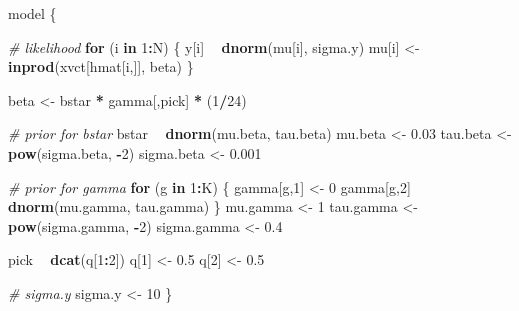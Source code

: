 \documentclass[]{article}
\newenvironment{Shaded}{\begin{snugshade}}{\end{snugshade}}
\newcommand{\KeywordTok}[1]{\textcolor[rgb]{0.13,0.29,0.53}{\textbf{#1}}}
\newcommand{\DecValTok}[1]{\textcolor[rgb]{0.00,0.00,0.81}{#1}}
\newcommand{\FloatTok}[1]{\textcolor[rgb]{0.00,0.00,0.81}{#1}}
\newcommand{\StringTok}[1]{\textcolor[rgb]{0.31,0.60,0.02}{#1}}
\newcommand{\CommentTok}[1]{\textcolor[rgb]{0.56,0.35,0.01}{\textit{#1}}}
\newcommand{\ControlFlowTok}[1]{\textcolor[rgb]{0.13,0.29,0.53}{\textbf{#1}}}
\newcommand{\OperatorTok}[1]{\textcolor[rgb]{0.81,0.36,0.00}{\textbf{#1}}}
\newcommand{\NormalTok}[1]{#1}
\begin{document}
\begin{Shaded}
\begin{Highlighting}[]
\NormalTok{model \{ }

  \CommentTok{# likelihood}
  \ControlFlowTok{for}\NormalTok{ (i }\ControlFlowTok{in} \DecValTok{1}\OperatorTok{:}\NormalTok{N) \{}
\NormalTok{    y[i]   }\OperatorTok{~}\StringTok{ }\KeywordTok{dnorm}\NormalTok{(mu[i], sigma.y)}
\NormalTok{    mu[i] <-}\StringTok{ }\KeywordTok{inprod}\NormalTok{(xvct[hmat[i,]], beta)}
\NormalTok{  \}}
  
\NormalTok{  beta <-}\StringTok{ }\NormalTok{bstar }\OperatorTok{*}\StringTok{ }\NormalTok{gamma[,pick] }\OperatorTok{*}\StringTok{ }\NormalTok{(}\DecValTok{1}\OperatorTok{/}\DecValTok{24}\NormalTok{)}
  
  \CommentTok{# prior for bstar}
\NormalTok{  bstar }\OperatorTok{~}\StringTok{ }\KeywordTok{dnorm}\NormalTok{(mu.beta, tau.beta)}
\NormalTok{  mu.beta <-}\StringTok{ }\FloatTok{0.03}
\NormalTok{  tau.beta <-}\StringTok{ }\KeywordTok{pow}\NormalTok{(sigma.beta, }\OperatorTok{-}\DecValTok{2}\NormalTok{)}
\NormalTok{  sigma.beta <-}\StringTok{ }\FloatTok{0.001}
  
  \CommentTok{# prior for gamma}
  \ControlFlowTok{for}\NormalTok{ (g }\ControlFlowTok{in} \DecValTok{1}\OperatorTok{:}\NormalTok{K) \{}
\NormalTok{    gamma[g,}\DecValTok{1}\NormalTok{] <-}\StringTok{ }\DecValTok{0}
\NormalTok{    gamma[g,}\DecValTok{2}\NormalTok{] }\OperatorTok{~}\StringTok{ }\KeywordTok{dnorm}\NormalTok{(mu.gamma, tau.gamma)}
\NormalTok{  \}}
\NormalTok{  mu.gamma <-}\StringTok{ }\DecValTok{1}
\NormalTok{  tau.gamma <-}\StringTok{ }\KeywordTok{pow}\NormalTok{(sigma.gamma, }\OperatorTok{-}\DecValTok{2}\NormalTok{)}
\NormalTok{  sigma.gamma <-}\StringTok{ }\FloatTok{0.4}
  
\NormalTok{  pick }\OperatorTok{~}\StringTok{ }\KeywordTok{dcat}\NormalTok{(q[}\DecValTok{1}\OperatorTok{:}\DecValTok{2}\NormalTok{])}
\NormalTok{  q[}\DecValTok{1}\NormalTok{] <-}\StringTok{ }\FloatTok{0.5}
\NormalTok{  q[}\DecValTok{2}\NormalTok{] <-}\StringTok{ }\FloatTok{0.5}
  
  \CommentTok{# sigma.y}
\NormalTok{  sigma.y <-}\StringTok{ }\DecValTok{10}
\NormalTok{\}}
\end{Highlighting}
\end{Shaded}
\end{document}
